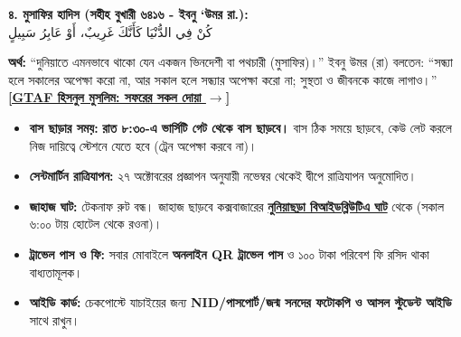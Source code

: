 \documentclass[11pt]{article}
\begin{document}
\begin{tcolorbox}[colframe=islamicgreen, colback=white, coltitle=white, title=\textbf{সফরের দোয়াসমূহ ও হাদিস (হিসনুল মুসলিম)}]
\begin{center}
\small\textbf{৪. মুসাফির হাদিস (সহীহ বুখারী ৬৪১৬ - ইবনু ‘উমর রা.):}\\[1mm]
{\large \color{islamicgreen} \textarabic{كُنْ فِي الدُّنْيَا كَأَنَّكَ غَرِيبٌ، أَوْ عَابِرُ سَبِيلٍ}}
\end{center}
\scriptsize
\textbf{অর্থ:} ``দুনিয়াতে এমনভাবে থাকো যেন একজন ভিনদেশী বা পথচারী (মুসাফির)।'' ইবনু উমর (রা) বলতেন: ``সন্ধ্যা হলে সকালের অপেক্ষা করো না, আর সকাল হলে সন্ধ্যার অপেক্ষা করো না; সুস্থতা ও জীবনকে কাজে লাগাও।''\\[1.5mm]
\href{https://dua.gtaf.org/bn/travel/all/}{\color{islamicgreen}\textbf{[GTAF হিসনুল মুসলিম: সফরের সকল দোয়া $\rightarrow$]}}
\end{tcolorbox}

\vspace{-0.5mm}

\begin{tcolorbox}[colframe=danger, colback=white, coltitle=white, title=\textbf{নোটিশ বোর্ডের জরুরি নির্দেশনা ও সতর্কতা}]
\small
\begin{itemize}
    \item \textbf{বাস ছাড়ার সময়:} \textbf{রাত ৮:৩০-এ ভার্সিটি গেট থেকে বাস ছাড়বে।} বাস ঠিক সময়ে ছাড়বে, কেউ লেট করলে নিজ দায়িত্বে স্টেশনে যেতে হবে (ট্রেন অপেক্ষা করবে না)।
    \item \textbf{সেন্টমার্টিন রাত্রিযাপন:} ২৭ অক্টোবরের প্রজ্ঞাপন অনুযায়ী নভেম্বর থেকেই দ্বীপে রাত্রিযাপন অনুমোদিত।
    \item \textbf{জাহাজ ঘাট:} টেকনাফ রুট বন্ধ। জাহাজ ছাড়বে কক্সবাজারের \href{https://maps.google.com/?q=BIWTA+Ghat+Nuniachhara+Coxs+Bazar}{\textbf{নুনিয়াছড়া বিআইডব্লিউটিএ ঘাট}} থেকে (সকাল ৬:০০ টায় হোটেল থেকে রওনা)।
    \item \textbf{ট্রাভেল পাস ও ফি:} সবার মোবাইলে \textbf{অনলাইন QR ট্রাভেল পাস} ও ১০০ টাকা পরিবেশ ফি রসিদ থাকা বাধ্যতামূলক।
    \item \textbf{আইডি কার্ড:} চেকপোস্টে যাচাইয়ের জন্য \textbf{NID/পাসপোর্ট/জন্ম সনদের ফটোকপি ও আসল স্টুডেন্ট আইডি} সাথে রাখুন।
\end{itemize}
\end{tcolorbox}

\newpage
\end{document}
